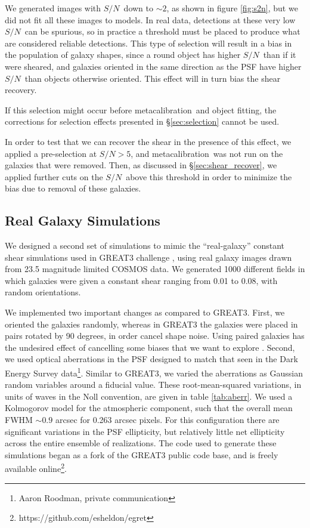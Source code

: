 \documentclass[a4paper,fleqn,usenatbib]{mnras}
\newcommand{\snr}{$S/N$}
\newcommand{\mcal}{metacalibration}
\begin{document}
We generated images with \snr\ down to $\sim 2$, as shown in figure
\ref{fig:s2n}, but we did not fit all these images to models.  In real data,
detections at these very low \snr\ can be spurious, so in practice a threshold
must be placed to produce what are considered reliable detections.  This type
of selection will result in a bias in the population of galaxy shapes, since
a round object has higher \snr\ than if it were sheared,
and galaxies oriented in the same direction as the PSF have higher \snr\
than objects otherwise oriented.  This effect will in turn bias
the shear recovery.

If this selection might occur before \mcal\ and object fitting, the corrections
for selection effects presented in \S \ref{sec:selection} cannot be used.

In order to test that we can recover the shear in the presence of this effect,
we applied a pre-selection at \snr$ > 5$, and \mcal\ was not run on the
galaxies that were removed.  Then, as discussed in \S \ref{sec:shear_recover},
we applied further cuts on the \snr\ above this threshold in order to minimize
the bias due to removal of these galaxies.


\subsection{Real Galaxy Simulations} \label{sec:cosmosim}

We designed a second set of simulations to mimic the ``real-galaxy'' constant
shear simulations used in GREAT3 challenge \citep{great3}, using real galaxy
images drawn from 23.5 magnitude limited COSMOS data.  We generated 1000
different fields in which galaxies were given a constant shear ranging from
0.01 to 0.08, with random orientations.

We implemented two important changes as compared to GREAT3.  First, we oriented
the galaxies randomly, whereas in GREAT3 the galaxies were placed in pairs
rotated by 90 degrees, in order cancel shape noise.  Using paired galaxies has
the undesired effect of cancelling some biases that we want to explore
\citep{DESSVShear}.  Second, we used optical aberrations in the PSF designed to
match that seen in the Dark Energy Survey data\footnote{Aaron Roodman, private
communication}.  Similar to GREAT3, we varied the aberrations as Gaussian
random variables around a fiducial value. These root-mean-squared variations,
in units of waves in the Noll convention, are given in table \ref{tab:aberr}.
We used a Kolmogorov model for the atmospheric component, such that
the overall mean FWHM $\sim 0.9$ arcsec for 0.263 arcsec pixels.
For this configuration there are
significant variations in the PSF ellipticity, but relatively little net
ellipticity across the entire ensemble of realizations.  The code used to
generate these simulations began as a fork of the GREAT3 public code base, and
is freely available online\footnote{https://github.com/esheldon/egret}.
\end{document}
